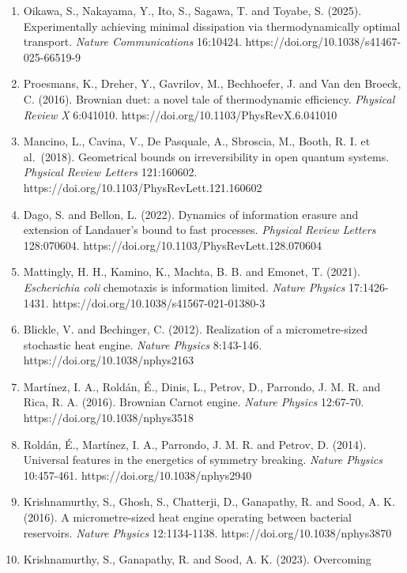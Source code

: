 \documentclass[
  10pt,
]{article}
\begin{document}
\begin{enumerate}
  limits for Brownian thermal shortcuts. \emph{Physical Review Letters}
  131:097101. https://doi.org/10.1103/PhysRevLett.131.097101
\item
  Oikawa, S., Nakayama, Y., Ito, S., Sagawa, T. and Toyabe, S. (2025).
  Experimentally achieving minimal dissipation via thermodynamically
  optimal transport. \emph{Nature Communications} 16:10424.
  https://doi.org/10.1038/s41467-025-66519-9
\item
  Proesmans, K., Dreher, Y., Gavrilov, M., Bechhoefer, J. and Van den
  Broeck, C. (2016). Brownian duet: a novel tale of thermodynamic
  efficiency. \emph{Physical Review X} 6:041010.
  https://doi.org/10.1103/PhysRevX.6.041010
\item
  Mancino, L., Cavina, V., De Pasquale, A., Sbroscia, M., Booth, R. I.
  et al.~(2018). Geometrical bounds on irreversibility in open quantum
  systems. \emph{Physical Review Letters} 121:160602.
  https://doi.org/10.1103/PhysRevLett.121.160602
\item
  Dago, S. and Bellon, L. (2022). Dynamics of information erasure and
  extension of Landauer's bound to fast processes. \emph{Physical Review
  Letters} 128:070604. https://doi.org/10.1103/PhysRevLett.128.070604
\item
  Mattingly, H. H., Kamino, K., Machta, B. B. and Emonet, T. (2021).
  \emph{Escherichia coli} chemotaxis is information limited.
  \emph{Nature Physics} 17:1426-1431.
  https://doi.org/10.1038/s41567-021-01380-3
\item
  Blickle, V. and Bechinger, C. (2012). Realization of a
  micrometre-sized stochastic heat engine. \emph{Nature Physics}
  8:143-146. https://doi.org/10.1038/nphys2163
\item
  Martínez, I. A., Roldán, É., Dinis, L., Petrov, D., Parrondo, J. M. R.
  and Rica, R. A. (2016). Brownian Carnot engine. \emph{Nature Physics}
  12:67-70. https://doi.org/10.1038/nphys3518
\item
  Roldán, É., Martínez, I. A., Parrondo, J. M. R. and Petrov, D. (2014).
  Universal features in the energetics of symmetry breaking.
  \emph{Nature Physics} 10:457-461. https://doi.org/10.1038/nphys2940
\item
  Krishnamurthy, S., Ghosh, S., Chatterji, D., Ganapathy, R. and Sood,
  A. K. (2016). A micrometre-sized heat engine operating between
  bacterial reservoirs. \emph{Nature Physics} 12:1134-1138.
  https://doi.org/10.1038/nphys3870
\item
  Krishnamurthy, S., Ganapathy, R. and Sood, A. K. (2023). Overcoming

\end{enumerate}
\end{document}
